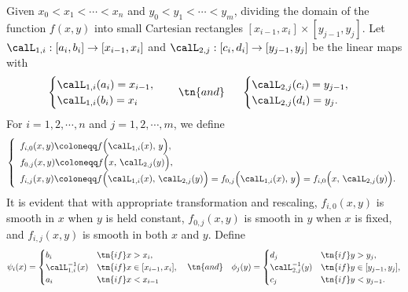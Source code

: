 \documentclass[review,hidelinks,onefignum,onetabnum]{siamart250211}
\begin{document}
Given \(x_0<x_1<\cdots<x_n\) and \(y_0<y_1<\cdots<y_m\), dividing the domain of the function \(f(x,y)\) into small Cartesian rectangles \([x_{i-1},x_i]\times [y_{j-1}, y_j]\).
Let $\calL_{1,i}:[a_i,b_i]\to [x_{i-1},x_i]$ and $\calL_{2,j}:[c_i,d_i]\to [y_{j-1},y_j]$ be the linear maps with 
\begin{equation}
\label{eq:L:1i:2j}
\begin{cases}
        \calL_{1,i}(a_i)=x_{i-1},\\
    \calL_{1,i}(b_i)=x_i
\end{cases}
     \quad \tn{and}\quad\,\   
     \begin{cases}
        \calL_{2,j}(c_i)=y_{j-1},\\
    \calL_{2,j}(d_i)=y_j.
\end{cases}
\end{equation}
For $i=1,2,\cdots,n$ and $j=1,2,\cdots,m$, we define
\begin{equation}
\label{eq:fij}
\left\{\begin{array}{l}
    f_{i,0}(x,y)\coloneqq  f\Big(\calL_{1,i}(x),\, y\Big),
\\
    f_{0,j}(x,y)\coloneqq  f\Big(x,\, \calL_{2,j}(y)\Big),
    \\
    f_{i,j}(x,y)\coloneqq  f\Big(\calL_{1,i}(x),\, \calL_{2,j}(y)\Big)=f_{0,j}\Big(\calL_{1,i}(x),\, y\Big)=f_{i,0}\Big(x,\, \calL_{2,j}(y)\Big).
\end{array}\right.
\end{equation}
It is evident that with appropriate transformation and rescaling, \(f_{i,0}(x,y)\) is smooth in \(x\) when \(y\) is held constant, \(f_{0,j}(x,y)\) is smooth in \(y\) when \(x\) is fixed, and \(f_{i,j}(x,y)\) is smooth in both \(x\) and \(y\). 
Define
\begin{equation}\label{eq:psii:phij}
    \psi_i(x)=\begin{cases}
        b_i &\tn{if  } x>x_{i},\\
        \calL_{1,i}^{-1}(x) &\tn{if  }x\in [x_{i-1},x_i],\\
        a_i &\tn{if  }x<x_{i-1}
    \end{cases}
    \quad \tn{and}\quad 
        \phi_j(y)=\begin{cases}
        d_j &\tn{if  } y>y_{j},\\
        \calL_{2,j}^{-1}(y) &\tn{if  }y\in [y_{j-1},y_j],\\
        c_j &\tn{if  }y<y_{j-1}.
    \end{cases}
\end{equation}
\end{document}
